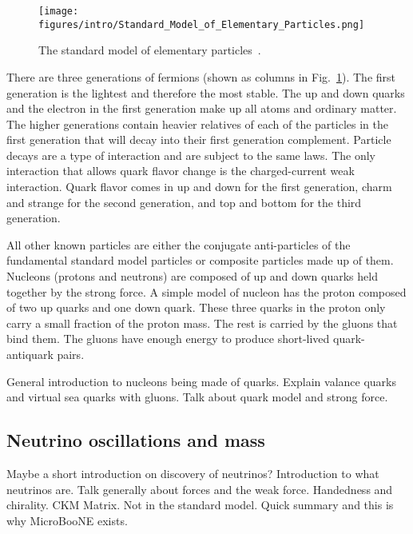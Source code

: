   \begin{figure}[ht]
    \centering
    \texttt{[image: figures/intro/Standard\_Model\_of\_Elementary\_Particles.png]}
    \caption{The standard model of elementary particles~\cite{wikipedia}.}
    \label{fig:standardmodel}
  \end{figure}

  There are three generations of fermions (shown as columns in
  Fig.~\ref{fig:standardmodel}). The first generation is the lightest and
  therefore the most stable. The up and down quarks and the electron in the
  first generation make up all atoms and ordinary matter. The higher
  generations contain heavier relatives of each of the particles in the first
  generation that will decay into their first generation complement. Particle
  decays are a type of interaction and are subject to the same laws. The only
  interaction that allows quark flavor change is the charged-current weak
  interaction. Quark flavor comes in up and down for the first generation,
  charm and strange for the second generation, and top and bottom for the third
  generation.

  All other known particles are either the conjugate anti-particles of the
  fundamental standard model particles or composite particles made up of them.
  Nucleons (protons and neutrons) are composed of up and down quarks held
  together by the strong force. A simple model of nucleon has the proton
  composed of two up quarks and one down quark. These three quarks in the
  proton only carry a small fraction of the proton mass. The rest is carried by
  the gluons that bind them. The gluons have enough energy to produce
  short-lived quark-antiquark pairs.

  General introduction to nucleons being made of quarks. Explain valance quarks
  and virtual sea quarks with gluons.  Talk about quark model and strong force.


\subsection{Neutrino oscillations and mass}\label{sec:bsm}
    Maybe a short introduction on discovery of neutrinos?
    Introduction to what neutrinos are. Talk generally about forces and the
    weak force.  Handedness and chirality. CKM Matrix.
  Not in the standard model. Quick summary and this is why MicroBooNE exists.

